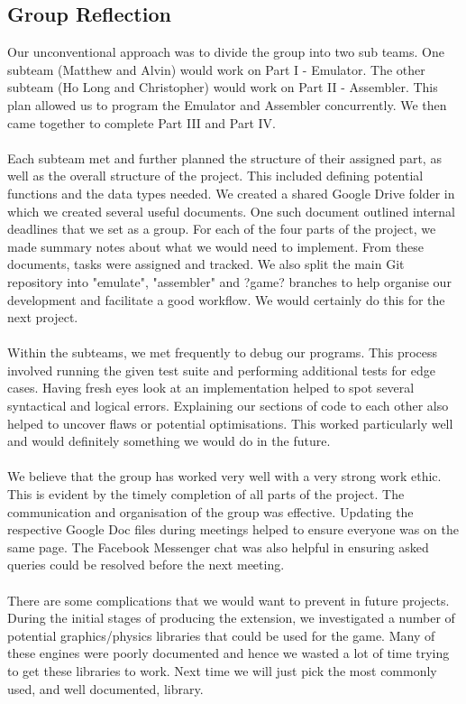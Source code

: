 \documentclass[11pt,twoside]{article}
\begin{document}
\subsection{Group Reflection}
Our unconventional approach was to divide the group into two sub teams. One subteam (Matthew and Alvin) would work on Part I - Emulator. The other subteam (Ho Long and Christopher) would work on Part II - Assembler. This plan allowed us to program the Emulator and Assembler concurrently. We then came together to complete Part III and Part IV.
\\\\
Each subteam met and further planned the structure of their assigned part, as well as the
overall structure of the project. This included defining potential functions and the data types needed. We created a shared Google Drive folder in which we created several useful documents. One such document outlined internal deadlines that we set as a group. For each of the four parts of the project, we made summary notes about what we would need to implement. From these documents, tasks were assigned and tracked. We also split the main Git repository into "emulate", "assembler" and ?game? branches to help organise our development and facilitate a good workflow. We would certainly do this for the next project.
\\\\
Within the subteams, we met frequently to debug our programs. This process involved running the given test suite and performing additional tests for edge cases. Having fresh eyes look at an implementation helped to spot several syntactical and logical errors. Explaining our sections of code to each other also helped to uncover flaws or potential optimisations. This worked particularly well and would definitely something we would do in the future.
\\\\
We believe that the group has worked very well with a very strong work ethic. This is evident by the timely completion of all parts of the project. The communication and organisation of the group was effective. Updating the respective Google Doc files during meetings helped to ensure everyone was on the same page. The Facebook Messenger chat was also helpful in ensuring asked queries could be resolved before the next meeting.
\\\\
There are some complications that we would want to prevent in future projects. During the initial stages of producing the extension, we investigated a number of potential graphics/physics libraries that could be used for the game. Many of these engines were poorly documented and hence we wasted a lot of time trying to get these libraries to work. Next time we will just pick the most commonly used, and well documented, library. 
\end{document}
